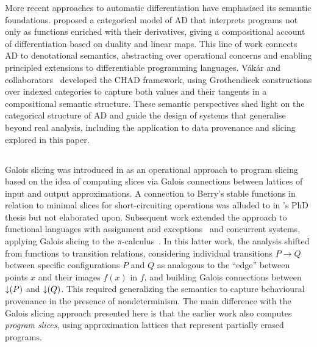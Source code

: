 More recent approaches to automatic differentiation have emphasised its semantic foundations.
\citet{elliott18} proposed a categorical model of AD that interprets programs not only as functions enriched
with their derivatives, giving a compositional account of differentiation based on duality and linear maps.
This line of work connects AD to denotational semantics, abstracting over operational concerns and enabling
principled extensions to differentiable programming languages. Vákár and
collaborators~\cite{vákár22,nunes2023} developed the CHAD framework, using Grothendieck constructions over
indexed categories to capture both values and their tangents in a compositional semantic structure. These
semantic perspectives shed light on the categorical structure of AD and guide the design of systems that
generalise beyond real analysis, including the application to data provenance and slicing explored in this
paper.

\subsection{\GPS}
\label{sec:related-work:galois-slicing}

Galois slicing was introduced in \cite{perera12a} as an operational approach to program slicing based on the
idea of computing slices via Galois connections between lattices of input and output approximations. A
connection to Berry's stable functions in relation to minimal slices for short-circuiting operations was
alluded to in \citeauthor{perera13}'s PhD thesis but not elaborated upon. Subsequent work extended the
approach to functional languages with assignment and exceptions~\cite{ricciotti17} and concurrent systems,
applying Galois slicing to the $\pi$-calculus~\cite{perera16d}. In this latter work, the analysis shifted from
functions to transition relations, considering individual transitions $P \longrightarrow Q$ between specific
configurations $P$ and $Q$ as analogous to the ``edge'' between points $x$ and their images $f(x)$ in $f$, and
building Galois connections between $\mathop{\downarrow}(P)$ and $\mathop{\downarrow}(Q)$. This required generalizing the semantics
to capture behavioural provenance in the presence of nondeterminism. The main difference with the Galois
slicing approach presented here is that the earlier work also computes \emph{program slices}, using
approximation lattices that represent partially erased programs.


